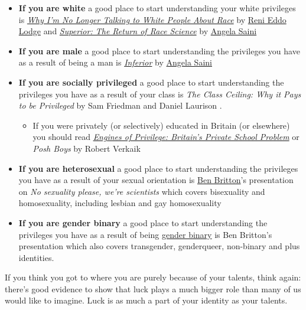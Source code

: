 \documentclass[
]{book}
\providecommand{\tightlist}{%
  \setlength{\itemsep}{0pt}\setlength{\parskip}{0pt}}
\begin{document}
\begin{itemize}
\tightlist
\item
  \textbf{If you are white} a good place to start understanding your white privileges is \emph{\href{https://en.wikipedia.org/wiki/Why_I'm_No_Longer_Talking_to_White_People_About_Race}{Why I'm No Longer Talking to White People About Race}} by \href{https://en.wikipedia.org/wiki/Reni_Eddo-Lodge}{Reni Eddo Lodge} \citep{nottalking} and \emph{\href{https://en.wikipedia.org/wiki/Superior:_The_Return_of_Race_Science}{Superior: The Return of Race Science}} by \href{https://en.wikipedia.org/wiki/Angela_Saini}{Angela Saini}
\item
  \textbf{If you are male} a good place to start understanding the privileges you have as a result of being a man is \emph{\href{https://en.wikipedia.org/wiki/Inferior_(book)}{Inferior}} by \href{https://en.wikipedia.org/wiki/Angela_Saini}{Angela Saini} \citep{inferior}
\item
  \textbf{If you are socially privileged} a good place to start understanding the privileges you have as a result of your class is \emph{The Class Ceiling: Why it Pays to be Privileged} by Sam Friedman and Daniel Laurison \citep{classceiling}.

  \begin{itemize}
  \tightlist
  \item
    If you were privately (or selectively) educated in Britain (or elsewhere) you should read \emph{\href{https://en.wikipedia.org/wiki/Engines_of_Privilege}{Engines of Privilege: Britain's Private School Problem}} \citep{nicebutdim} or \emph{Posh Boys} by Robert Verkaik \citep{poshboys}
  \end{itemize}
\item
  \textbf{If you are heterosexual} a good place to start understanding the privileges you have as a result of your sexual orientation is \href{https://en.wikipedia.org/wiki/Ben_Britton}{Ben Britton}'s presentation on \emph{No sexuality please, we're scientists} \citep{nosex} which covers bisexuality and homosexuality, including lesbian and gay homosexuality
\item
  \textbf{If you are gender binary} a good place to start understanding the privileges you have as a result of being \href{https://en.wikipedia.org/wiki/Gender_binary}{gender binary} is Ben Britton's presentation \citep{nosex} which also covers transgender, genderqueer, non-binary and plus identities.
\end{itemize}

If you think you got to where you are purely because of your talents, think again: there's good evidence to show that luck plays a much bigger role than many of us would like to imagine. \citep{luckynottalented} Luck is as much a part of your identity as your talents.
\end{document}
